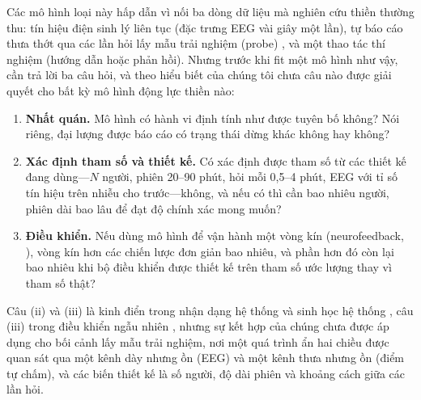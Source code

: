 Các mô hình loại này hấp dẫn vì nối ba dòng dữ liệu mà nghiên cứu thiền thường thu: tín hiệu điện sinh lý liên tục (đặc trưng EEG vài giây một lần), tự báo cáo thưa thớt qua các lần hỏi lấy mẫu trải nghiệm (probe) \citep{Hasenkamp2012,Weinstein2018,Brandmeyer2018}, và một thao tác thí nghiệm (hướng dẫn hoặc phản hồi). Nhưng trước khi fit một mô hình như vậy, cần trả lời ba câu hỏi, và theo hiểu biết của chúng tôi chưa câu nào được giải quyết cho bất kỳ mô hình động lực thiền nào:
\begin{enumerate}[label=(\roman*)]
  \item \textbf{Nhất quán.} Mô hình có hành vi định tính như được tuyên bố không? Nói riêng, đại lượng được báo cáo có trạng thái dừng khác không hay không?
  \item \textbf{Xác định tham số và thiết kế.} Có xác định được tham số từ các thiết kế đang dùng---$N$ người, phiên 20--90 phút, hỏi mỗi 0,5--4 phút, EEG với tỉ số tín hiệu trên nhiễu cho trước---không, và nếu có thì cần bao nhiêu người, phiên dài bao lâu để đạt độ chính xác mong muốn?
  \item \textbf{Điều khiển.} Nếu dùng mô hình để vận hành một vòng kín (neurofeedback, \citealp{Sitaram2017,Ros2020}), vòng kín hơn các chiến lược đơn giản bao nhiêu, và phần hơn đó còn lại bao nhiêu khi bộ điều khiển được thiết kế trên tham số ước lượng thay vì tham số thật?
\end{enumerate}
Câu (ii) và (iii) là kinh điển trong nhận dạng hệ thống và sinh học hệ thống \citep{Bellman1970,Rothenberg1971,Walter1997,Ljung1999,Raue2009,Chis2011,Villaverde2016,Wieland2021,Kreutz2009}, câu (iii) trong điều khiển ngẫu nhiên \citep{Astrom1970,Anderson1990}, nhưng sự kết hợp của chúng chưa được áp dụng cho bối cảnh lấy mẫu trải nghiệm, nơi một quá trình ẩn hai chiều được quan sát qua một kênh dày nhưng ồn (EEG) và một kênh thưa nhưng ồn (điểm tự chấm), và các biến thiết kế là số người, độ dài phiên và khoảng cách giữa các lần hỏi.

